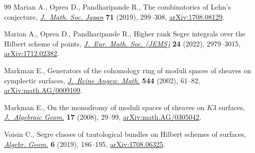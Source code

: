 \documentclass[pdftex]{sigma}
\numberwithin{equation}{section}
\newcommand{\1}{\mathsf{1}}
\begin{document}
\begin{thebibliography}{99}
Marian A., Oprea D., Pandharipande R., The combinatorics of {L}ehn's
  conjecture, \href{https://doi.org/10.2969/jmsj/78747874}{\textit{J.~Math. Soc. Japan}} \textbf{71} (2019), 299--308,
  \href{https://arxiv.org/abs/1708.08129}{arXiv:1708.08129}.

Marian A., Oprea D., Pandharipande R., Higher rank {S}egre integrals over the
  {H}ilbert scheme of points, \href{https://doi.org/10.4171/jems/1149}{\textit{J.~Eur. Math. Soc. (JEMS)}} \textbf{24}
  (2022), 2979--3015, \href{https://arxiv.org/abs/1712.02382}{arXiv:1712.02382}.

Markman E., Generators of the cohomology ring of moduli spaces of sheaves on
  symplectic surfaces, \href{https://doi.org/10.1515/crll.2002.028}{\textit{J.~Reine Angew. Math.}} \textbf{544} (2002),
  61--82, \href{https://arxiv.org/abs/math.AG/0009109}{arXiv:math.AG/0009109}.

Markman E., On the monodromy of moduli spaces of sheaves on {$K3$} surfaces,
  \href{https://doi.org/10.1090/S1056-3911-07-00457-2}{\textit{J.~Algebraic Geom.}} \textbf{17} (2008), 29--99,
  \href{https://arxiv.org/abs/math.AG/0305042}{arXiv:math.AG/0305042}.

Voisin C., Segre classes of tautological bundles on {H}ilbert schemes of
  surfaces, \href{https://doi.org/10.14231/AG-2019-010}{\textit{Algebr. Geom.}} \textbf{6} (2019), 186--195,
  \href{https://arxiv.org/abs/1708.06325}{arXiv:1708.06325}.

\end{thebibliography}\LastPageEnding
\end{document}
